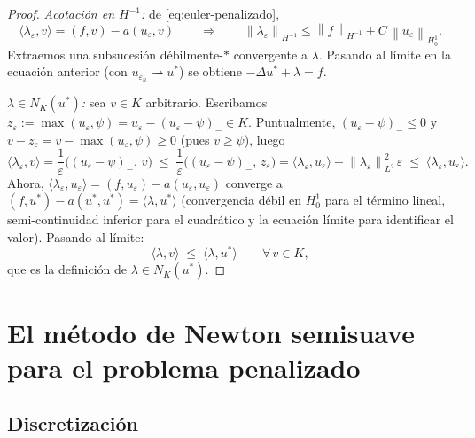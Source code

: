 \documentclass[11pt,a4paper]{article}
\theoremstyle{definition}
\theoremstyle{remark}
\newcommand{\Norm}[1]{\left\lVert #1 \right\rVert}
\begin{document}
\begin{proof}
\emph{Acotación en $H^{-1}$:} de \eqref{eq:euler-penalizado},
\[
\langle \lambda_\varepsilon, v \rangle = (f, v) - a(u_\varepsilon, v)
\qquad\Longrightarrow\qquad
\Norm{\lambda_\varepsilon}_{H^{-1}} \le \Norm{f}_{H^{-1}} + C\,\Norm{u_\varepsilon}_{H^1_0}.
\]
Extraemos una subsucesión débilmente-$\ast$ convergente a $\lambda$.
Pasando al límite en la ecuación anterior (con
$u_{\varepsilon_n} \rightharpoonup u^\ast$) se obtiene
$-\Delta u^\ast + \lambda = f$.

\emph{$\lambda \in N_K(u^\ast)$:} sea $v \in K$ arbitrario. Escribamos
$z_\varepsilon := \max(u_\varepsilon, \psi) = u_\varepsilon -
(u_\varepsilon - \psi)_- \in K$. Puntualmente,
$(u_\varepsilon - \psi)_- \le 0$ y $v - z_\varepsilon = v - \max(u_\varepsilon, \psi) \ge 0$
(pues $v \ge \psi$), luego
\[
\langle \lambda_\varepsilon, v \rangle
= \frac{1}{\varepsilon}\bigl( (u_\varepsilon - \psi)_- ,\, v \bigr)
\;\le\; \frac{1}{\varepsilon}\bigl( (u_\varepsilon - \psi)_- ,\, z_\varepsilon \bigr)
= \langle \lambda_\varepsilon, u_\varepsilon \rangle
- \Norm{\lambda_\varepsilon}_{L^2}^2\,\varepsilon
\;\le\; \langle \lambda_\varepsilon, u_\varepsilon \rangle .
\]
Ahora, $\langle \lambda_\varepsilon, u_\varepsilon \rangle
= (f, u_\varepsilon) - a(u_\varepsilon, u_\varepsilon)$ converge a
$(f, u^\ast) - a(u^\ast, u^\ast) = \langle \lambda, u^\ast \rangle$
(convergencia débil en $H^1_0$ para el término lineal,
semi-continuidad inferior para el cuadrático y la ecuación límite para
identificar el valor). Pasando al límite:
\[
\langle \lambda, v \rangle \;\le\; \langle \lambda, u^\ast \rangle
\qquad \forall\, v \in K,
\]
que es la definición de $\lambda \in N_K(u^\ast)$.
\end{proof}

\section{El método de Newton semisuave para el problema penalizado}

\subsection{Discretización}
\end{document}
